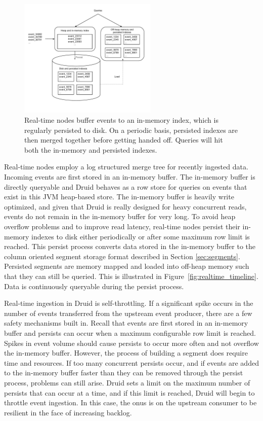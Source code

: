 \documentclass{vldb}
\begin{document}
\begin{figure}
\centering
\includegraphics[width = 2.6in]{realtime_flow}
\caption{Real-time nodes buffer events to an in-memory index, which is
regularly persisted to disk. On a periodic basis, persisted indexes are then merged
together before getting handed off.
Queries will hit both the in-memory and persisted indexes.
}
\label{fig:realtime_flow}
\end{figure}

Real-time nodes employ a log structured merge tree\cite{o1996log} for recently
ingested data. Incoming events are first stored in an in-memory buffer. The
in-memory buffer is directly queryable and Druid behaves as a row store for
queries on events that exist in this JVM heap-based store. The in-memory buffer
is heavily write optimized, and given that Druid is really designed for heavy
concurrent reads, events do not remain in the in-memory buffer for very long.
To avoid heap overflow problems and to improve read latency, real-time nodes
persist their in-memory indexes to disk either periodically or after some
maximum row limit is reached. This persist process converts data stored in the
in-memory buffer to the column oriented segment storage format described in
Section \ref{sec:segments}.  Persisted segments are memory mapped and loaded
into off-heap memory such that they can still be queried. This is illustrated
in Figure~\ref{fig:realtime_timeline}. Data is continuously queryable during
the persist process.

Real-time ingestion in Druid is self-throttling. If a significant spike occurs
in the number of events transferred from the upstream event producer, there are
a few safety mechanisms built in. Recall that events are first stored in an
in-memory buffer and persists can occur when a maximum configurable row limit
is reached. Spikes in event volume should cause persists to occur more often
and not overflow the in-memory buffer. However, the process of building a
segment does require time and resources. If too many concurrent persists occur,
and if events are added to the in-memory buffer faster than they can be removed
through the persist process, problems can still arise. Druid sets a limit on
the maximum number of persists that can occur at a time, and if this limit is
reached, Druid will begin to throttle event ingestion. In this case, the onus
is on the upstream consumer to be resilient in the face of increasing backlog.
\end{document}
